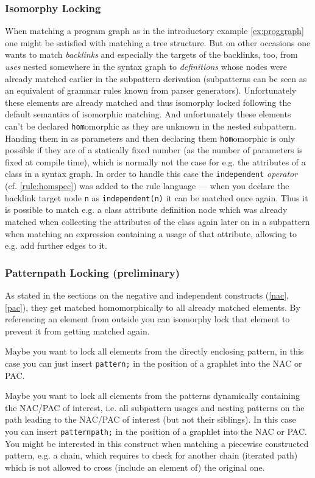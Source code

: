 \subsubsection*{Isomorphy Locking}
When matching a program graph as in the introductory example \ref{ex:proggraph} one might be satisfied with matching a tree structure.
But on other occasions one wants to match \emph{backlinks} and especially the targets of the backlinks, too, 
from \emph{uses} nested somewhere in the syntax graph to \emph{definitions} whose nodes were already matched earlier in the subpattern derivation (subpatterns can be seen as an equivalent of grammar rules known from parser generators).
Unfortunately these elements are already matched and thus isomorphy locked following the default semantics of isomorphic matching.
And unfortunately these elements can't be declared \texttt{hom}omorphic as they are unknown in the nested subpattern.
Handing them in as parameters and then declaring them \texttt{hom}omorphic is only possible if they are of a statically fixed number (as the number of parameters is fixed at compile time), which is normally not the case for e.g. the attributes of a class in a syntax graph.
In order to handle this case the \texttt{independent} \emph{operator} (cf. \ref{rule:homspec}) was added to the rule language
--- when you declare the backlink target node \texttt{n} as \texttt{independent(n)} it can be matched once again.
Thus it is possible to match e.g. a class attribute definition node which was already matched when collecting the attributes of the class again later on in a subpattern when matching an expression containing a usage of that attribute, allowing to e.g. add further edges to it.

\subsubsection*{Patternpath Locking (preliminary)} 
As stated in the sections on the negative and independent constructs (\ref{nac}, \ref{pac}), they get matched homomorphically to all already matched elements. By referencing an element from outside you can isomorphy lock that element to prevent it from getting matched again.

Maybe you want to lock all elements from the directly enclosing pattern, in this case you can just insert \texttt{pattern;} in the position of a graphlet into the NAC or PAC.

Maybe you want to lock all elements from the patterns dynamically containing the NAC/PAC of interest, i.e. all subpattern usages and nesting patterns on the path leading to the NAC/PAC of interest (but not their siblings). In this case you can insert \texttt{patternpath;} in the position of a graphlet into the NAC or PAC. You might be interested in this construct when matching a piecewise constructed pattern, e.g. a chain, which requires to check for another chain (iterated path) which is not allowed to cross (include an element of) the original one.


